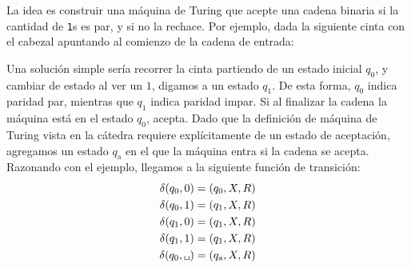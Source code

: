 \documentclass{article}
\newcommand{\blank}{\text{\tt \textvisiblespace}}
\theoremstyle{definition}
\begin{document}
La idea es construir una máquina de Turing que acepte una cadena binaria si la
cantidad de {\tt 1}s es par, y si no la rechace. Por ejemplo, dada la siguiente
cinta con el cabezal apuntando al comienzo de la cadena de entrada:

\begin{center}
\end{center}
Una solución simple sería recorrer la cinta partiendo de un estado inicial
$q_0$, y cambiar de estado al ver un $1$, digamos a un estado $q_1$. De esta
forma, $q_0$ indica paridad par, mientras que $q_1$ indica paridad impar. Si al
finalizar la cadena la máquina está en el estado $q_0$, acepta. Dado que la
definición de máquina de Turing vista en la cátedra requiere explícitamente de
un estado de aceptación, agregamos un estado $q_{\text{a}}$ en el que la
máquina entra si la cadena se acepta. Razonando con el ejemplo, llegamos a la
siguiente función de transición:
\begin{align*}
 \delta(q_0, 0) &= (q_0, X, R) \\
 \delta(q_0, 1) &= (q_1, X, R) \\
 \delta(q_1, 0) &= (q_1, X, R) \\
 \delta(q_1, 1) &= (q_1, X, R) \\
 \delta(q_0, \text{\blank}) &= (q_{\text{a}}, X, R)
\end{align*}
\end{document}
